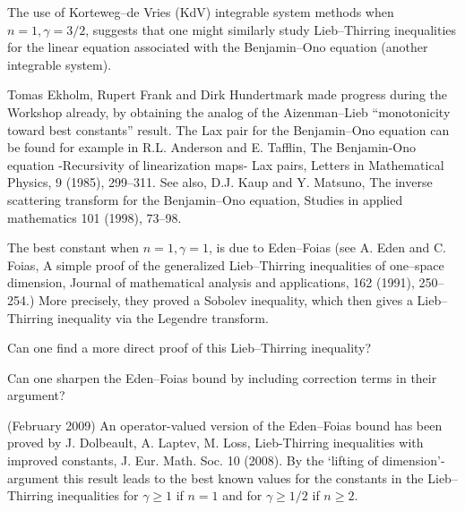 \documentclass[12pt,letterpaper, reqno]{amsart}
\begin{document}
\begin{problemblock}


\begin{problem}[2.23]  
The use of Korteweg--de Vries
(KdV) integrable system methods when $n=1, \gamma=3/2$, suggests
that one might similarly study Lieb--Thirring inequalities for the
linear equation associated with the Benjamin--Ono equation (another
integrable system).
\end{problem}

\begin{distinguishedremark}
Tomas Ekholm, Rupert Frank and Dirk Hundertmark
made progress during the Workshop already, by obtaining the analog
of the Aizenman--Lieb ``monotonicity toward best constants'' result.
The Lax pair for the Benjamin--Ono equation can be found for example
in R.L. Anderson and E. Tafflin, The Benjamin-Ono equation
-Recursivity of linearization maps- Lax pairs,
Letters in Mathematical Physics, 9 (1985), 299--311. See also,
D.J. Kaup and Y. Matsuno, The inverse scattering transform
for the Benjamin--Ono equation,
Studies in applied mathematics 101 (1998), 73--98.
\end{distinguishedremark}

\end{problemblock}

\begin{problemblock}
The best constant when $n=1,
\gamma=1$, is due to Eden--Foias
(see A. Eden and C. Foias, A simple proof of the
generalized Lieb--Thirring inequalities of one--space dimension,
Journal of mathematical analysis and applications, 162 (1991), 250--254.)
More precisely, they proved a Sobolev inequality, which then gives a
Lieb--Thirring inequality via the Legendre transform.

\begin{problem}[2.26]  
Can one find a more direct proof of this Lieb--Thirring
inequality?
\end{problem}
\end{problemblock}

\begin{problemblock}
\begin{problem}[2.3]
Can one sharpen the Eden--Foias bound by including correction terms in their argument?
\end{problem}

\begin{remark}
(February 2009) An operator-valued version of the Eden--Foias bound
has been proved by J. Dolbeault, A. Laptev, M. Loss, Lieb-Thirring
inequalities with improved constants, J. Eur. Math. Soc. 10 (2008). By
the `lifting of dimension'-argument this result leads to the best
known values for the constants in the Lieb--Thirring inequalities for
$\gamma\geq 1$ if $n=1$ and for $\gamma\geq 1/2$ if $n\geq 2$.
\end{remark}

\end{problemblock}
\end{document}
